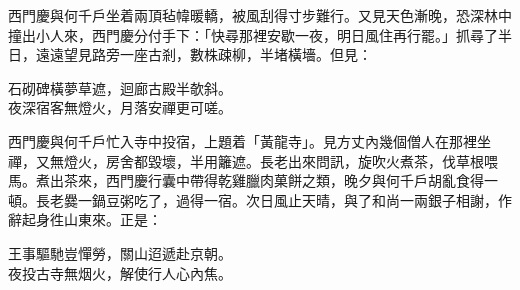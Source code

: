 西門慶與何千戶坐着兩頂毡幃暖轎，被風刮得寸步難行。又見天色漸晚，恐深林中撞出小人來，西門慶分付手下：「快尋那裡安歇一夜，明日風住再行罷。」抓尋了半日，遠遠望見路旁一座古剎，數株疎柳，半堵橫墻。但見：

\begin{myquote}
石砌碑橫夢草遮，迴廊古殿半欹斜。\\夜深宿客無燈火，月落安禪更可嗟。
\end{myquote}

西門慶與何千戶忙入寺中投宿，上題着「黃龍寺」。見方丈內幾個僧人在那裡坐禪，又無燈火，房舍都毀壞，半用籬遮。{}長老出來問訊，旋吹火煮茶，伐草根喂馬。煮出茶來，西門慶行囊中帶得乾雞臘肉菓餅之類，晚夕與何千戶胡亂食得一頓。長老爨一鍋豆粥吃了，過得一宿。次日風止天晴，與了和尚一兩銀子相謝，作辭起身徃山東來。正是：

\begin{myquote}
王事驅馳豈憚勞，關山迢遞赴京朝。\\夜投古寺無烟火，解使行人心內焦。
\end{myquote}

